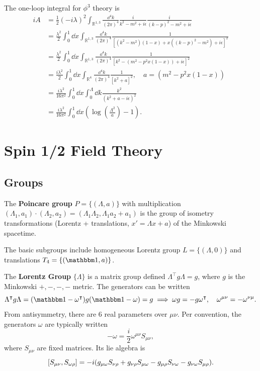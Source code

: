 \documentclass{article}
\begin{document}
The one-loop integral for $\phi^3$ theory is 
\begin{align*}
    iA&=\frac 12(-i\lambda)^2\int_{\mathbb R^{1,3}}\frac{\dd^4k}{(2\pi)^4}\frac{i}{k^2-m^2+i\epsilon}\frac{i}{(k-p)^2-m^2+i\epsilon}\\
    &=\frac{\lambda^2}{2}\int^1_0\dd x\int_{\mathbb R^{1,3}}\frac{\dd^4k}{(2\pi)^4}\frac{1}{[(k^2-m^2)(1-x)+x((k-p)^2-m^2)+i\epsilon]^2}\\
    &=\frac{\lambda^2}{2}\int^1_0\dd x\int_{\mathbb R^{1,3}}\frac{\dd^4k}{(2\pi)^4}\frac{1}{[k^2-(m^2-p^2x(1-x))+i\epsilon]^2}\\
    &=\frac{i\lambda^2}{2}\int^1_0\dd x\int_{\mathbb R^4}\frac{\dd^4k}{(2\pi)^4}\frac{1}{[k^2+a]^2},\quad a=(m^2-p^2x(1-x))\\
    &=\frac{i\lambda^2}{16\pi^2}\int^1_0\dd x\int^\Lambda_0\dd k\frac{k^2}{(k^2+a-i\epsilon)^2}\\
    &=\frac{i\lambda^2}{16\pi^2}\int^1_0\dd x\left(\log\left(\frac{\Lambda^2}{a}\right)-1\right).
\end{align*}


\pagebreak

\section{Spin 1/2 Field Theory}

\subsection{Groups}

The \textbf{Poincare group} $P=\{(\Lambda,a)\}$ with multiplication $(\Lambda_1,a_1)\cdot (\Lambda_2,a_2)=(\Lambda_1\Lambda_2,\Lambda_1a_2+a_1)$ is the group of isometry transformations (Lorentz + translations, $x'=\Lambda x+a$) of the Minkowski spacetime. 

The basic subgroups include homogeneous Lorentz group $L=\{(\Lambda,0)\}$ and translations $T_4=\{(\mathbbm 1,a)\}$.

The \textbf{Lorentz Group} $\{\Lambda\}$ is a matrix group defined $\Lambda^\intercal g\Lambda=g$, where $g$ is the Minkowski $+,-,-,-$ metric. The generators can be written 
$$\Lambda^\intercal g\Lambda=(\mathbbm 1-\omega^\intercal)g(\mathbbm 1-\omega)=g\implies\omega g=-g\omega^\intercal,\quad \omega^{\mu\nu}=-\omega^{\nu\mu}.$$
From antisymmetry, there are 6 real parameters over $\mu\nu$. Per convention, the generators $\omega$ are typically written 
$$-\omega=\frac i2\omega^{\mu\nu}S_{\mu\nu},$$
where $S_{\mu\nu}$ are fixed matrices. Its lie algebra is 
$$\comm{S_{\mu\nu}}{S_{\omega\rho}}=-i(g_{\mu\omega}S_{\nu\rho}+g_{\nu\rho}S_{\mu\omega}-g_{\mu\rho}S_{\nu\omega}-g_{\nu\omega}S_{\mu\rho}).$$
\end{document}
